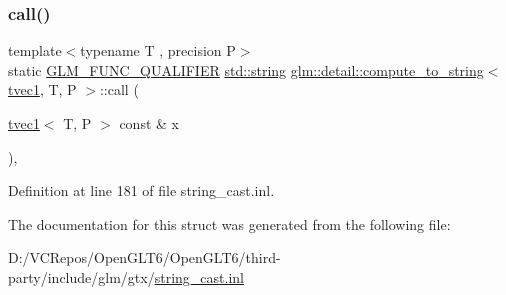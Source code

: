 \subsubsection{\texorpdfstring{call()}{call()}}
{\footnotesize\ttfamily template$<$typename T , precision P$>$ \\
static \mbox{\hyperlink{setup_8hpp_a33fdea6f91c5f834105f7415e2a64407}{G\+L\+M\+\_\+\+F\+U\+N\+C\+\_\+\+Q\+U\+A\+L\+I\+F\+I\+ER}} \mbox{\hyperlink{glad_8h_ac83513893df92266f79a515488701770}{std\+::string}} \mbox{\hyperlink{structglm_1_1detail_1_1compute__to__string}{glm\+::detail\+::compute\+\_\+to\+\_\+string}}$<$ \mbox{\hyperlink{structglm_1_1tvec1}{tvec1}}, T, P $>$\+::call (\begin{DoxyParamCaption}\item[{\mbox{\hyperlink{structglm_1_1tvec1}{tvec1}}$<$ T, P $>$ const \&}]{x }\end{DoxyParamCaption})\hspace{0.3cm}{\ttfamily [inline]}, {\ttfamily [static]}}



Definition at line 181 of file string\+\_\+cast.\+inl.



The documentation for this struct was generated from the following file\+:\begin{DoxyCompactItemize}
\item 
D\+:/\+V\+C\+Repos/\+Open\+G\+L\+T6/\+Open\+G\+L\+T6/third-\/party/include/glm/gtx/\mbox{\hyperlink{string__cast_8inl}{string\+\_\+cast.\+inl}}\end{DoxyCompactItemize}
